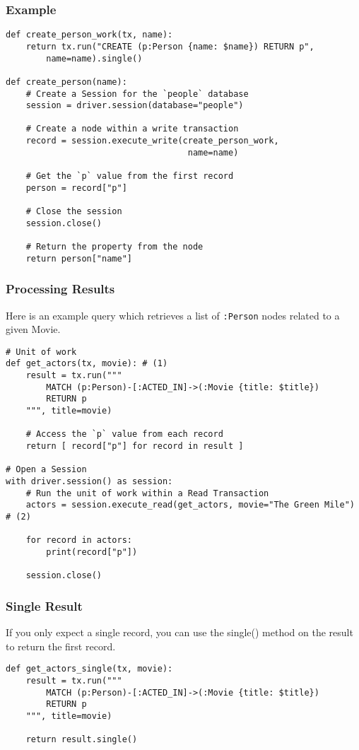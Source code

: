 \begin{frame}[fragile]\frametitle{Example}

\begin{lstlisting}
def create_person_work(tx, name):
    return tx.run("CREATE (p:Person {name: $name}) RETURN p",
        name=name).single()

def create_person(name):
    # Create a Session for the `people` database
    session = driver.session(database="people")

    # Create a node within a write transaction
    record = session.execute_write(create_person_work,
                                    name=name)

    # Get the `p` value from the first record
    person = record["p"]

    # Close the session
    session.close()

    # Return the property from the node
    return person["name"]
\end{lstlisting}

\end{frame}

\begin{frame}[fragile]\frametitle{Processing Results}

Here is an example query which retrieves a list of \lstinline|:Person| nodes related to a given Movie.

\begin{lstlisting}
# Unit of work
def get_actors(tx, movie): # (1)
    result = tx.run("""
        MATCH (p:Person)-[:ACTED_IN]->(:Movie {title: $title})
        RETURN p
    """, title=movie)

    # Access the `p` value from each record
    return [ record["p"] for record in result ]

# Open a Session
with driver.session() as session:
    # Run the unit of work within a Read Transaction
    actors = session.execute_read(get_actors, movie="The Green Mile") # (2)

    for record in actors:
        print(record["p"])

    session.close()
\end{lstlisting}

\end{frame}

\begin{frame}[fragile]\frametitle{Single Result}

If you only expect a single record, you can use the single() method on the result to return the first record.

\begin{lstlisting}
def get_actors_single(tx, movie):
    result = tx.run("""
        MATCH (p:Person)-[:ACTED_IN]->(:Movie {title: $title})
        RETURN p
    """, title=movie)

    return result.single()
\end{lstlisting}

\end{frame}

